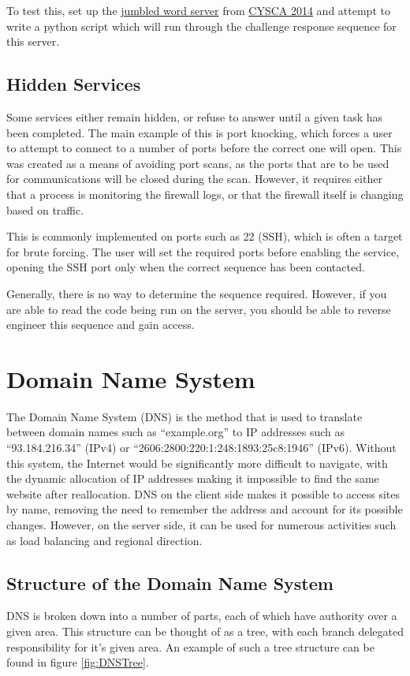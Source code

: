			To test this, set up the \href{https://github.com/CySCA/CySCA2014/blob/master/misc-server/programming/prog01/server.py}{jumbled word server} from \href{https://cyberchallenge.com.au/}{CYSCA 2014} and attempt to write a python script which will run through the challenge response sequence for this server.

		\subsection{Hidden Services}
			Some services either remain hidden, or refuse to answer until a given task has been completed.
			The main example of this is port knocking, which forces a user to attempt to connect to a number of ports before the correct one will open.
			This was created as a means of avoiding port scans, as the ports that are to be used for communications will be closed during the scan.
			However, it requires either that a process is monitoring the firewall logs, or that the firewall itself is changing based on traffic.

			This is commonly implemented on ports such as 22 (SSH), which is often a target for brute forcing.
			The user will set the required ports before enabling the service, opening the SSH port only when the correct sequence has been contacted.

			Generally, there is no way to determine the sequence required.
			However, if you are able to read the code being run on the server, you should be able to reverse engineer this sequence and gain access.

	\section{Domain Name System}
		The Domain Name System (DNS) is the method that is used to translate between domain names such as ``example.org'' to IP addresses such as ``93.184.216.34'' (IPv4) or ``2606:2800:220:1:248:1893:25c8:1946'' (IPv6).
		Without this system, the Internet would be significantly more difficult to navigate, with the dynamic allocation of IP addresses making it impossible to find the same website after reallocation.
		DNS on the client side makes it possible to access sites by name, removing the need to remember the address and account for its possible changes.
		However, on the server side, it can be used for numerous activities such as load balancing and regional direction.

		\subsection{Structure of the Domain Name System}
			DNS is broken down into a number of parts, each of which have authority over a given area.
			This structure can be thought of as a tree, with each branch delegated responsibility for it's given area.
			An example of such a tree structure can be found in figure \ref{fig:DNSTree}.

